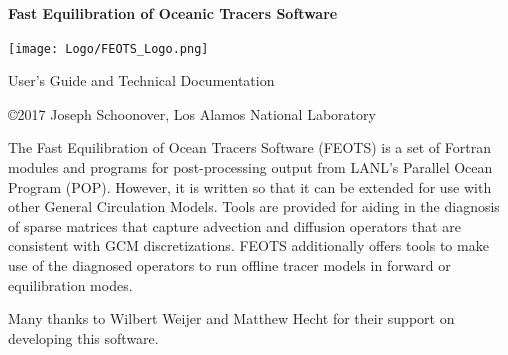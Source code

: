 \documentclass{softwaremanual}
\author{Joseph Schoonover, Jiaxu Zhang, Wilbert Weijer}
\date{}
\begin{document}
\frontmatter
\begin{titlingpage}
    
        \vspace*{2cm}


   {\selectfont
   \begin{center}
     \Large{\textbf{ Fast Equilibration of Oceanic Tracers Software  }}\\
   \end{center}
    } 
\hspace{3.2385cm} \texttt{[image: Logo/FEOTS\_Logo.png]}

      
 
        
        \vspace{2cm}
        
     \begin{center}
     
        { \selectfont
          \large{ User's Guide and Technical Documentation }\\
          \vspace{1.5cm}
          \textbf{\large{\theauthor}}
          
        }
        
        \vspace{8cm}
        
        \copyright 2017 Joseph Schoonover, Los Alamos National Laboratory
     \end{center}
        
    
\end{titlingpage}

The Fast Equilibration of Ocean Tracers Software (FEOTS) is a set of Fortran modules and programs for post-processing output from LANL's Parallel Ocean Program (POP). However, it is written so that it can be extended for use with other General Circulation Models. Tools are provided for aiding in the diagnosis of sparse matrices that capture advection and diffusion operators that are consistent with GCM discretizations. FEOTS additionally offers tools to make use of the diagnosed operators to run offline tracer models in forward or equilibration modes.


 Many thanks to Wilbert Weijer and Matthew Hecht for their support on developing this software.
  
\end{document}
